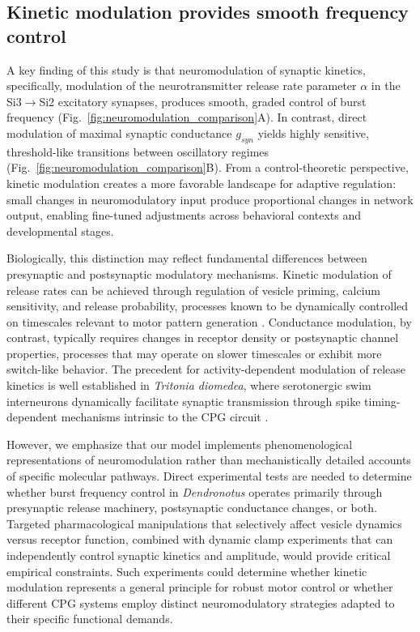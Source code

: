\documentclass[nofootinbib,aip,amsmath,amssymb,preprint,twocolumn,floatfix,10pt]{revtex4-2}
\begin{document}
\subsection{Kinetic modulation provides smooth frequency control}

A key finding of this study is that neuromodulation of synaptic kinetics, specifically, modulation of the neurotransmitter release rate parameter $\alpha$ in the Si3$\to$Si2 excitatory synapses, produces smooth, graded control of burst frequency (Fig.~\ref{fig:neuromodulation_comparison}A). In contrast, direct modulation of maximal synaptic conductance $g_{syn}$ yields highly sensitive, threshold-like transitions between oscillatory regimes (Fig.~\ref{fig:neuromodulation_comparison}B). From a control-theoretic perspective, kinetic modulation creates a more favorable landscape for adaptive regulation: small changes in neuromodulatory input produce proportional changes in network output, enabling fine-tuned adjustments across behavioral contexts and developmental stages.

Biologically, this distinction may reflect fundamental differences between presynaptic and postsynaptic modulatory mechanisms. Kinetic modulation of release rates can be achieved through regulation of vesicle priming, calcium sensitivity, and release probability, processes known to be dynamically controlled on timescales relevant to motor pattern generation \cite{NeherBrose2018, jackman2017mechanisms}. Conductance modulation, by contrast, typically requires changes in receptor density or postsynaptic channel properties, processes that may operate on slower timescales or exhibit more switch-like behavior. The precedent for activity-dependent modulation of release kinetics is well established in \textit{Tritonia diomedea}, where serotonergic swim interneurons dynamically facilitate synaptic transmission through spike timing-dependent mechanisms intrinsic to the CPG circuit \cite{katz1994dynamic, sakurai2003spike}.

However, we emphasize that our model implements phenomenological representations of neuromodulation rather than mechanistically detailed accounts of specific molecular pathways. Direct experimental tests are needed to determine whether burst frequency control in \textit{Dendronotus} operates primarily through presynaptic release machinery, postsynaptic conductance changes, or both. Targeted pharmacological manipulations that selectively affect vesicle dynamics versus receptor function, combined with dynamic clamp experiments that can independently control synaptic kinetics and amplitude, would provide critical empirical constraints. Such experiments could determine whether kinetic modulation represents a general principle for robust motor control or whether different CPG systems employ distinct neuromodulatory strategies adapted to their specific functional demands.
\end{document}
